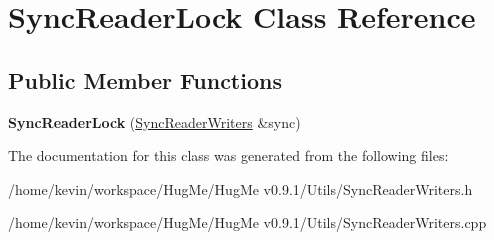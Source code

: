 \hypertarget{classSyncReaderLock}{
\section{SyncReaderLock Class Reference}
\label{classSyncReaderLock}
}
\subsection*{Public Member Functions}
\begin{DoxyCompactItemize}
\item 
\hypertarget{classSyncReaderLock_a6ab55055466363811f0153989e6c931f}{
{\bfseries SyncReaderLock} (\hyperlink{classSyncReaderWriters}{SyncReaderWriters} \&sync)}
\label{classSyncReaderLock_a6ab55055466363811f0153989e6c931f}

\end{DoxyCompactItemize}


The documentation for this class was generated from the following files:\begin{DoxyCompactItemize}
\item 
/home/kevin/workspace/HugMe/HugMe v0.9.1/Utils/SyncReaderWriters.h\item 
/home/kevin/workspace/HugMe/HugMe v0.9.1/Utils/SyncReaderWriters.cpp\end{DoxyCompactItemize}
